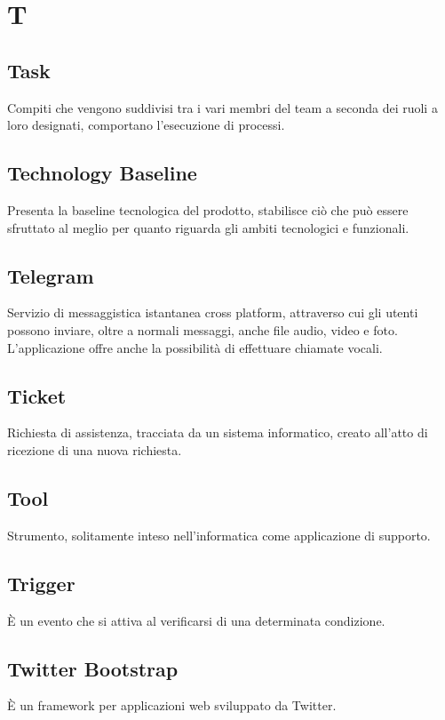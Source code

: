 \section*{T}

\subsection{Task}
Compiti che vengono suddivisi tra i vari membri del team a seconda dei ruoli a loro designati, comportano l'esecuzione di processi.

\subsection{Technology Baseline}
Presenta la baseline tecnologica del prodotto, stabilisce ciò che può essere sfruttato al meglio per quanto riguarda gli ambiti tecnologici  e funzionali.

\subsection{Telegram}
Servizio di messaggistica istantanea cross platform, attraverso cui gli utenti possono inviare, oltre a normali messaggi, anche file audio, video e foto. L'applicazione offre anche la possibilità di effettuare chiamate vocali.

\subsection{Ticket}
Richiesta di assistenza, tracciata da un sistema informatico, creato all'atto di ricezione di una nuova richiesta.

\subsection{Tool}
Strumento, solitamente inteso nell'informatica come applicazione di supporto.

\subsection{Trigger}
È un evento che si attiva al verificarsi di una determinata condizione.

\subsection{Twitter Bootstrap}
È un framework per applicazioni web sviluppato da Twitter.


